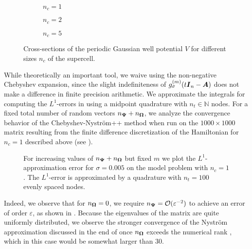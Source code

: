 \begin{figure}[ht]
    \begin{subfigure}[b]{0.32\columnwidth}
        
        \caption{$n_c=1$}
        \label{fig:gaussian-well-1}
    \end{subfigure}
    \begin{subfigure}[b]{0.32\columnwidth}
        
        \caption{$n_c=2$}
        \label{fig:gaussian-well-2}
    \end{subfigure}
    \begin{subfigure}[b]{0.32\columnwidth}
        
        \caption{$n_c=5$}
        \label{fig:gaussian-well-5}
    \end{subfigure}
    \caption{Cross-sections of the periodic Gaussian well potential $V$ for different sizes $n_c$ of the supercell.}
    \label{fig:gaussian-well}
\end{figure}

While theoretically an important tool, we waive using the non-negative Chebyshev expansion, since the slight indefiniteness of $g_{\sigma}^{(m)}(t \boldsymbol{I}_n - \boldsymbol{A})$  does not make a difference in finite precision arithmetic. We approximate the integrals for computing the $L^1$-errors in  using a midpoint quadrature with $n_t \in \mathbb{N}$ nodes. For a fixed total number of random vectors $n_{\boldsymbol{\Psi}} + n_{\boldsymbol{\Omega}}$, we analyze the convergence behavior of the Chebyshev-Nyström++ method when run on the $1000 \times 1000$ matrix resulting from the finite difference discretization of the Hamiltonian for $n_c = 1$ described above (see ). 

\begin{figure}[ht]
    \centering
    
    \caption{For increasing values of $n_{\boldsymbol{\Psi}} + n_{\boldsymbol{\Omega}}$ but fixed $m$ we plot the $L^1$-approximation error for $\sigma=0.005$ on the model problem with $n_c = 1$. The $L^1$-error is approximated by a quadrature with $n_t = 100$ evenly spaced nodes.}
    \label{fig:convergence}
\end{figure}

Indeed, we observe that for $n_{\boldsymbol{\Omega}} = 0$, we require $n_{\boldsymbol{\Psi}} = \mathcal{O}(\varepsilon^{-2})$ to achieve an error of order $\varepsilon$, as shown in . Because the eigenvalues of the matrix are quite uniformly distributed, we observe the stronger convergence of the Nyström approximation discussed in the end of  once $n_{\boldsymbol{\Omega}}$ exceeds the numerical rank , which in this case would be somewhat larger than $30$.

